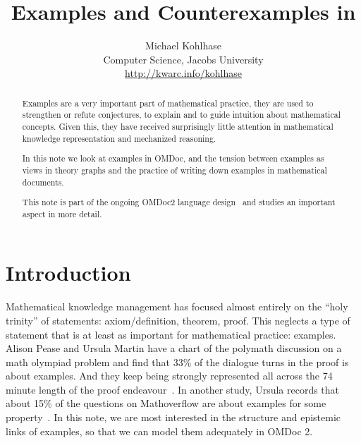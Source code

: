 \documentclass[11pt]{bluenote}
\title{Examples and Counterexamples in \omdoc}
\author{Michael Kohlhase\\Computer Science,  Jacobs University\\\url{http://kwarc.info/kohlhase}}
\def\omdoc{OMDoc\xspace}
\def\omdocv#1{OMDoc#1\xspace}
\def\omdoc{OMDoc\xspace}
\begin{document}
\maketitle
\begin{abstract}
  Examples are a very important part of mathematical practice, they are used to strengthen
  or refute conjectures, to explain and to guide intuition about mathematical
  concepts. Given this, they have received surprisingly little attention in mathematical
  knowledge representation and mechanized reasoning. 

  In this note we look at examples in \omdoc, and the tension between examples as views in
  theory graphs and the practice of writing down examples in mathematical documents.

  This note is part of the ongoing \omdocv2 language design~\cite{Kohlhase:old13} and
  studies an important aspect in more detail.
\end{abstract}
\tableofcontents\newpage

\section{Introduction}

Mathematical knowledge management has focused almost entirely on the ``holy trinity'' of
statements: axiom/definition, theorem, proof. This neglects a type of statement that is at
least as important for mathematical practice: examples.  Alison Pease and Ursula Martin
have a chart of the polymath discussion on a math olympiad problem and find that 33\% of
the dialogue turns in the proof is about examples. And they keep being strongly
represented all across the 74 minute length of the proof
endeavour~\cite{PeaMar:sfmm12}. In another study, Ursula records that about 15\% of the
questions on Mathoverflow are about examples for some property~\cite{MarPea:wmtapm13}. In
this note, we are most interested in the structure and epistemic links of examples, so
that we can model them adequately in \omdoc2.
\end{document}
